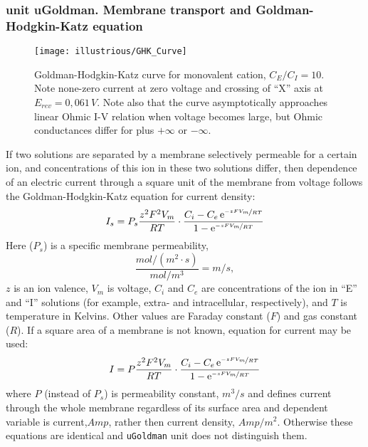 \documentclass[12pt,a4paper,oneside]{article}
\newcommand{\euler}{\mathrm{e}}
\newcommand{\code}[1]{\texttt{#1}}
\begin{document}
\subsubsection{unit uGoldman. Membrane transport and Goldman-Hodgkin-Katz equation} 
\begin{figure}[tb]
	\centering
	\texttt{[image: illustrious/GHK\_Curve]}
	\caption{Goldman-Hodgkin-Katz curve for monovalent cation, $C_{E}/C_{I} = 10$. Note none-zero current at zero voltage and crossing of ``X'' axis at $E_{rev}=0,061\, V$. Note also that the curve asymptotically approaches linear Ohmic I-V relation when voltage becomes large, but Ohmic conductances differ for plus $+\infty$ or $-\infty$.}
	\label{fig:GHK}
\end{figure}
If two solutions are separated by a membrane selectively permeable for a certain ion, and concentrations of this ion in these two solutions differ, then dependence of an electric current through a square unit of the membrane from voltage follows the Goldman-Hodgkin-Katz equation for current density:
\begin{equation}\label{eq:GHK_current_density}
	I_s=P_s\dfrac{z^2F^2V_m}{RT}\cdot\dfrac{{C_i}-{C_e}\,\euler^{\nicefrac{-zFV_m}{RT}}}{1-\euler^{\nicefrac{-zFV_m}{RT}}}
\end{equation}
Here ($P_s$) is a specific membrane permeability, 
\[ 
\dfrac{mol/(m^2\cdot s)}{mol/m^3}=m/s,	
\]
$z$ is an ion valence, $V_m$ is voltage, $C_i$ and $C_e$ are concentrations of the ion in ``E'' and ``I'' solutions (for example, extra- and intracellular, respectively), and $T$ is temperature in Kelvins. Other values are Faraday constant ($F$) and gas constant ($R$).
If a square area of a membrane is not known, equation for current may be used:
\begin{equation}\label{eq:GHK_current}
	I=P\dfrac{z^2F^2V_m}{RT}\cdot\dfrac{{C_i}-{C_e}\,\euler^{\nicefrac{-zFV_m}{RT}}}{1-\euler^{\nicefrac{-zFV_m}{RT}}}
\end{equation}
where $P$ (instead of $P_s$) is permeability constant, $m^3/s$ and defines current through the whole membrane regardless of its surface area and dependent variable is current,$ Amp$, rather then current density, $Amp/m^2$. Otherwise these equations are identical and \code{uGoldman} unit does not distinguish them. 
\end{document}
